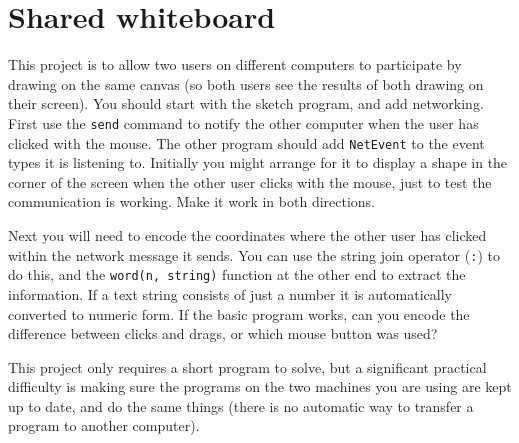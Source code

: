\documentclass[12pt,a4paper,twoside]{article}
\renewcommand{\_}{\texttt{\symbol{95}}}
\begin{document}
%
%
%

\newpage
\section{Shared whiteboard}

This project is to allow two users on different computers to participate
by drawing on the same canvas (so both users see the results of both
drawing on their screen). You should start with the sketch program,
and add networking. First use the \verb^send^ command to notify the other
computer when the user has clicked with the mouse. The other program
should add \verb^NetEvent^ to the event types it is listening to.
Initially you might arrange for it to display a shape in the
corner of the screen when the other user clicks with the mouse, just to
test the communication is working. Make it work in both directions.

Next you will need to encode the coordinates where the other user has
clicked within the network message it sends. You can use the string
join operator (\verb^:^) to do this, and the \verb^word(n, string)^
function at the other end to extract the information. If a text string
consists of just a number it is automatically converted to numeric form.
If the basic program works, can you encode the difference between
clicks and drags, or which mouse button was used?

This project only requires a short program to solve, but a significant
practical difficulty is making sure the programs on the two machines
you are using are kept up to date, and do the same things (there is
no automatic way to transfer a program to another computer).

\end{document}
